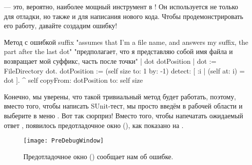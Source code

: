 \documentclass[a4paper,10pt,twoside]{book}
\begin{document}
 --- это, вероятно, наиболее мощный инструмент в \pharo! Он используется не только для отладки, но также и для написания нового кода.
Чтобы продемонстрировать его работу, давайте создадим ошибку!


\begin{method}[buggy]{Метод с ошибкой}
suffix
	"assumes that I'm a file name, and answers my suffix, the part after the last dot"
	"предполагает, что я представляю собой имя файла и возвращает мой суффикс, часть после точки"
	| dot dotPosition |
	dot := FileDirectory dot.
	dotPosition := (self size to: 1 by: -1) detect: [ :i | (self at: i) = dot ].
	^ self copyFrom: dotPosition to: self size 
\end{method}

Конечно, мы уверены, что такой тривиальный метод будет работать, поэтому, вместо того, чтобы написать SUnit-тест, мы просто введём
 в рабочей области и выберите в меню .
Вот так сюрприз! Вместо того, чтобы напечатать ожидаемый ответ , появилось предотладочное окно (), как показано на .

\begin{figure}[btp]
	\begin{center}
	\texttt{[image: PreDebugWindow]}
	\end{center}
	\caption{Предотладочное окно () сообщает нам об ошибке.}
\end{figure}
\end{document}
